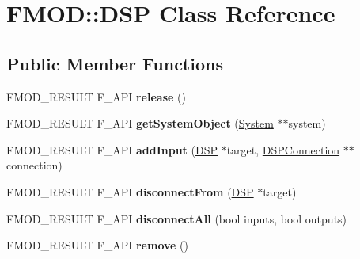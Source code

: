 \hypertarget{class_f_m_o_d_1_1_d_s_p}{\section{F\-M\-O\-D\-:\-:D\-S\-P Class Reference}
\label{class_f_m_o_d_1_1_d_s_p}
}
\subsection*{Public Member Functions}
\begin{DoxyCompactItemize}
\item 
\hypertarget{class_f_m_o_d_1_1_d_s_p_a4ffd9dbcf1b0119a2ab94d27744ee033}{F\-M\-O\-D\-\_\-\-R\-E\-S\-U\-L\-T F\-\_\-\-A\-P\-I {\bfseries release} ()}\label{class_f_m_o_d_1_1_d_s_p_a4ffd9dbcf1b0119a2ab94d27744ee033}

\item 
\hypertarget{class_f_m_o_d_1_1_d_s_p_a06bef2d5b365de903e12fff814da31c7}{F\-M\-O\-D\-\_\-\-R\-E\-S\-U\-L\-T F\-\_\-\-A\-P\-I {\bfseries get\-System\-Object} (\hyperlink{class_f_m_o_d_1_1_system}{System} $\ast$$\ast$system)}\label{class_f_m_o_d_1_1_d_s_p_a06bef2d5b365de903e12fff814da31c7}

\item 
\hypertarget{class_f_m_o_d_1_1_d_s_p_a647ccb2fdd73ecc1ce2c9a7a5411cb8c}{F\-M\-O\-D\-\_\-\-R\-E\-S\-U\-L\-T F\-\_\-\-A\-P\-I {\bfseries add\-Input} (\hyperlink{class_f_m_o_d_1_1_d_s_p}{D\-S\-P} $\ast$target, \hyperlink{class_f_m_o_d_1_1_d_s_p_connection}{D\-S\-P\-Connection} $\ast$$\ast$connection)}\label{class_f_m_o_d_1_1_d_s_p_a647ccb2fdd73ecc1ce2c9a7a5411cb8c}

\item 
\hypertarget{class_f_m_o_d_1_1_d_s_p_a4a7dec17c9528099e23fe92102c10c38}{F\-M\-O\-D\-\_\-\-R\-E\-S\-U\-L\-T F\-\_\-\-A\-P\-I {\bfseries disconnect\-From} (\hyperlink{class_f_m_o_d_1_1_d_s_p}{D\-S\-P} $\ast$target)}\label{class_f_m_o_d_1_1_d_s_p_a4a7dec17c9528099e23fe92102c10c38}

\item 
\hypertarget{class_f_m_o_d_1_1_d_s_p_a3eb9cfc992a069357bbebeafffad9c8e}{F\-M\-O\-D\-\_\-\-R\-E\-S\-U\-L\-T F\-\_\-\-A\-P\-I {\bfseries disconnect\-All} (bool inputs, bool outputs)}\label{class_f_m_o_d_1_1_d_s_p_a3eb9cfc992a069357bbebeafffad9c8e}

\item 
\hypertarget{class_f_m_o_d_1_1_d_s_p_ae7503115a44e52310e9a7cfe4063cd81}{F\-M\-O\-D\-\_\-\-R\-E\-S\-U\-L\-T F\-\_\-\-A\-P\-I {\bfseries remove} ()}\label{class_f_m_o_d_1_1_d_s_p_ae7503115a44e52310e9a7cfe4063cd81}


\end{DoxyCompactItemize}
